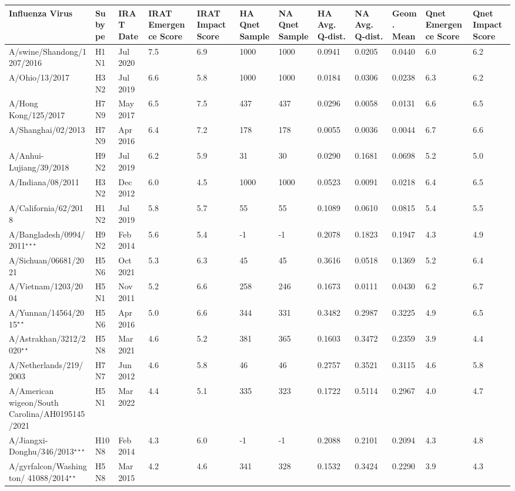 \begin{tabular}{L{1.32in}|L{.35in}|L{.3in}|L{.3in}|L{.3in}|L{.35in}|L{.35in}|L{.35in}|L{.35in}|L{.32in}|L{.3in}|L{.3in}}\hline
Influenza Virus & Subype & IRAT Date &IRAT Emergence Score &IRAT Impact Score &HA Qnet Sample &NA Qnet Sample &HA Avg. Q-dist. &NA Avg. Q-dist. &Geom. Mean&Qnet Emergence Score&Qnet Impact Score \\\hline
 A/swine/Shandong/1207/2016 &H1N1& Jul  2020 &7.5&6.9&1000&1000&0.0941&0.0205&0.0440&6.0&6.2\\\hline
 A/Ohio/13/2017 &H3N2& Jul  2019 &6.6&5.8&1000&1000&0.0184&0.0306&0.0238&6.3&6.2\\\hline
 A/Hong  Kong/125/2017 &H7N9& May  2017 &6.5&7.5&437&437&0.0296&0.0058&0.0131&6.6&6.5\\\hline
 A/Shanghai/02/2013 &H7N9& Apr  2016 &6.4&7.2&178&178&0.0055&0.0036&0.0044&6.7&6.6\\\hline
 A/Anhui-Lujiang/39/2018 &H9N2& Jul  2019 &6.2&5.9&31&30&0.0290&0.1681&0.0698&5.2&5.0\\\hline
 A/Indiana/08/2011 &H3N2& Dec  2012 &6.0&4.5&1000&1000&0.0523&0.0091&0.0218&6.4&6.5\\\hline
 A/California/62/2018 &H1N2& Jul  2019 &5.8&5.7&55&55&0.1089&0.0610&0.0815&5.4&5.5\\\hline
 A/Bangladesh/0994/2011$^{\star\star\star}$ &H9N2& Feb  2014 &5.6&5.4&-1&-1&0.2078&0.1823&0.1947&4.3&4.9\\\hline
 A/Sichuan/06681/2021 &H5N6& Oct  2021 &5.3&6.3&45&45&0.3616&0.0518&0.1369&5.2&6.4\\\hline
 A/Vietnam/1203/2004 &H5N1& Nov  2011 &5.2&6.6&258&246&0.1673&0.0111&0.0430&6.2&6.7\\\hline
 A/Yunnan/14564/2015$^{\star\star}$ &H5N6& Apr  2016 &5.0&6.6&344&331&0.3482&0.2987&0.3225&4.9&6.5\\\hline
 A/Astrakhan/3212/2020$^{\star\star}$ &H5N8& Mar  2021 &4.6&5.2&381&365&0.1603&0.3472&0.2359&3.9&4.4\\\hline
 A/Netherlands/219/2003 &H7N7& Jun  2012 &4.6&5.8&46&46&0.2757&0.3521&0.3115&4.6&5.8\\\hline
 A/American  wigeon/South  Carolina/AH0195145/2021 &H5N1& Mar  2022 &4.4&5.1&335&323&0.1722&0.5114&0.2967&4.0&4.7\\\hline
 A/Jiangxi-Donghu/346/2013$^{\star\star\star}$ &H10N8& Feb  2014 &4.3&6.0&-1&-1&0.2088&0.2101&0.2094&4.3&4.8\\\hline
 A/gyrfalcon/Washington/ 41088/2014$^{\star\star}$ &H5N8& Mar  2015 &4.2&4.6&341&328&0.1532&0.3424&0.2290&3.9&4.3\\\hline

\end{tabular}
